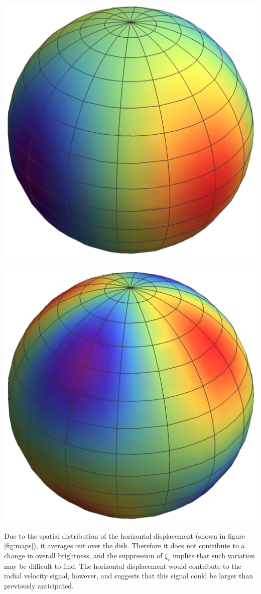 \documentclass[a0,portrait]{a0poster}
\begin{document}
\begin{multicols}{2}
\begin{tcolorbox}[colframe=black,colback=blue!10!white]
\begin{center}\vspace{1.0cm}
\includegraphics[width=0.45\linewidth]{radial_map_complex_crop_transp}
~
~
~
~
~
~
\includegraphics[width=0.45\linewidth]{tangential_map_complex_crop_transp}
\label{fig:maps}
\end{center}\vspace{1.0cm}


Due to the spatial distribution of the horizontal displacement (shown in figure \ref{fig:maps}), it averages out over the disk. Therefore it does not contribute to a change in overall brightness, and the suppression of $\xi_{r}$ implies that such variation may be difficult to find. The horizontal displacement would contribute to the radial velocity signal, however, and suggests that this signal could be larger than previously anticipated.


\end{tcolorbox}
\end{multicols}
\end{document}
